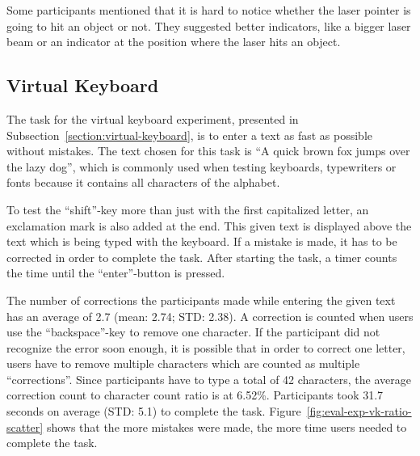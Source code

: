 Some participants mentioned that it is hard to notice whether the laser pointer is going to hit an object or not. They suggested better indicators, like a bigger laser beam or an indicator at the position where the laser hits an object.


\subsection{Virtual Keyboard}\label{section:eval-res-vk}

The task for the virtual keyboard experiment, presented in Subsection~\ref{section:virtual-keyboard}, is to enter a text as fast as possible without mistakes. The text chosen for this task is \enquote{A quick brown fox jumps over the lazy dog}, which is commonly used when testing keyboards, typewriters or fonts because it contains all characters of the alphabet.

To test the \enquote{shift}-key more than just with the first capitalized letter, an exclamation mark is also added at the end. This given text is displayed above the text which is being typed with the keyboard. If a mistake is made, it has to be corrected in order to complete the task. After starting the task, a timer counts the time until the \enquote{enter}-button is pressed.

The number of corrections the participants made while entering the given text has an average of 2.7 (mean: 2.74; \gls{STD}: 2.38). A correction is counted when users use the \enquote{backspace}-key to remove one character. If the participant did not recognize the error soon enough, it is possible that in order to correct one letter, users have to remove multiple characters which are counted as multiple \enquote{corrections}. Since participants have to type a total of 42 characters, the average correction count to character count ratio is at 6.52\%.
Participants took 31.7 seconds on average (\gls{STD}: 5.1) to complete the task. Figure~\ref{fig:eval-exp-vk-ratio-scatter} shows that the more mistakes were made, the more time users needed to complete the task.

